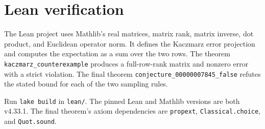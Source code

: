 \documentclass[11pt]{article}
\begin{document}
\section*{Lean verification}
The Lean project uses Mathlib's real matrices, matrix rank, matrix
inverse, dot product, and Euclidean operator norm. It defines the
Kaczmarz error projection and computes the expectation as a sum over
the two rows. The theorem \texttt{kaczmarz\_counterexample} produces
a full-row-rank matrix and nonzero error with a strict violation.
The final theorem \texttt{conjecture\_00000007845\_false} refutes the
stated bound for each of the two sampling rules.

Run \texttt{lake build} in \texttt{lean/}. The pinned Lean and Mathlib
versions are both v4.33.1. The final theorem's axiom dependencies are
\texttt{propext}, \texttt{Classical.choice}, and \texttt{Quot.sound}.
\end{document}
